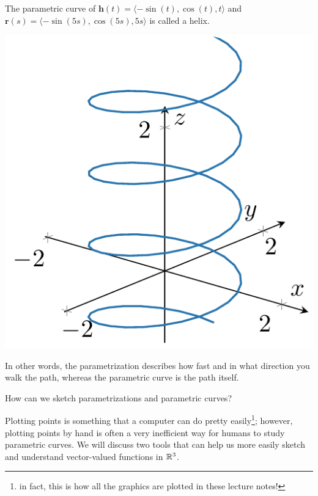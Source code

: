 \begin{example}
The parametric curve of $\bm{h}(t) = \langle -\sin(t), \cos(t), t \rangle$ and $\bm{r}(s) = \langle -\sin(5s), \cos(5s), 5s \rangle$ is called a helix.


 \begin{center}        
        \includegraphics[scale=.75]{chapters/2-RealAnalysis/figures/figures-helixcurve.pdf}
    \end{center}

\end{example}


In other words, the parametrization describes how fast and in what direction you walk the path, whereas the parametric curve is the path itself.

\begin{motivating}
How can we sketch parametrizations and parametric curves?
\end{motivating}

Plotting points is something that a computer can do pretty easily\footnote{in fact, this is how all the graphics are plotted in these lecture notes!}; however, plotting points by hand is often a very inefficient way for humans to study parametric curves.  We will discuss two tools that can help us more easily sketch and understand vector-valued functions in $\mathbb{R}^3$.

